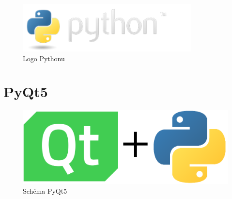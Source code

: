 \begin{figure}[H] \centering
    \includegraphics[width=260pt]{./pictures/python-logo.png}
    \caption[Logo Pythonu]{Logo Pythonu \cite{python}}
	\label{fig:python-logo}                                
\end{figure} 

\section{PyQt5}

\begin{figure}[H] \centering
    \includegraphics[width=400pt]{./pictures/pyqt.png}
    \caption[Schéma PyQt5 Pythonu]{Schéma PyQt5}
	\label{fig:pyqt}                                
\end{figure} 